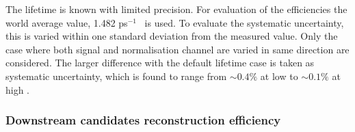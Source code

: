 The \Lb lifetime is known with limited precision. For evaluation of the efficiencies the
world average value, 1.482 ps$^{-1}$~\cite{Aaij:2013oha} is used. To evaluate the systematic uncertainty,
this is varied within one standard deviation from the measured value.
Only the case where both signal and normalisation channel are varied in same direction are considered.
The larger difference with the default lifetime case is taken as systematic uncertainty,
which is found to range from $\sim 0.4\%$ at low \qsq to $\sim 0.1\%$ at high \qsq.

\subsubsection{Downstream candidates reconstruction efficiency}


